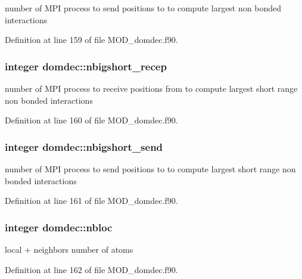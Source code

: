 number of M\-P\-I process to send positions to to compute largest non bonded interactions 



Definition at line 159 of file M\-O\-D\-\_\-domdec.\-f90.

\hypertarget{classdomdec_ad95084fcf28a5965b0e5ad423ee0697f}{
\subsubsection[{nbigshort\-\_\-recep}]{\setlength{\rightskip}{0pt plus 5cm}integer domdec\-::nbigshort\-\_\-recep}}\label{classdomdec_ad95084fcf28a5965b0e5ad423ee0697f}


number of M\-P\-I process to receive positions from to compute largest short range non bonded interactions 



Definition at line 160 of file M\-O\-D\-\_\-domdec.\-f90.

\hypertarget{classdomdec_a7b930faf1e5cfbfc5f71442a81f49dbb}{
\subsubsection[{nbigshort\-\_\-send}]{\setlength{\rightskip}{0pt plus 5cm}integer domdec\-::nbigshort\-\_\-send}}\label{classdomdec_a7b930faf1e5cfbfc5f71442a81f49dbb}


number of M\-P\-I process to send positions to to compute largest short range non bonded interactions 



Definition at line 161 of file M\-O\-D\-\_\-domdec.\-f90.

\hypertarget{classdomdec_aa10da3a10adb24dfdbcb8ce13d4d3883}{
\subsubsection[{nbloc}]{\setlength{\rightskip}{0pt plus 5cm}integer domdec\-::nbloc}}\label{classdomdec_aa10da3a10adb24dfdbcb8ce13d4d3883}


local + neighbors number of atoms 



Definition at line 162 of file M\-O\-D\-\_\-domdec.\-f90.

